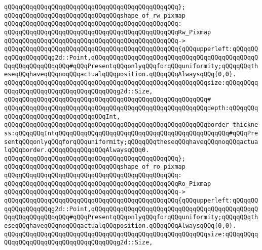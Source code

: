 \verb|qQQqqQQqqQQqqQQqqQQqqQQqqQQqqQQqqQQqqQQqqQQqqQQq};|\newline
\newline
\verb|qQQqqQQqqQQqqQQqqQQqqQQqqQQqqQQqshape_of_rw_pixmap|\newline
\verb|qQQqqQQqqQQqqQQqqQQqqQQqqQQqqQQqqQQqqQQqqQQqqQQq:|\newline
\verb|qQQqqQQqqQQqqQQqqQQqqQQqqQQqqQQqqQQqqQQqqQQqqQQqRw_Pixmap|\newline
\verb|qQQqqQQqqQQqqQQqqQQqqQQqqQQqqQQqqQQqqQQqqQQqqQQq->|\newline
\verb|qQQqqQQqqQQqqQQqqQQqqQQqqQQqqQQqqQQqqQQqqQQqqQQq{qQQqupperleft:qQQqqQQqqQQqqQQqqQQqg2d::Point,qQQqqQQqqQQqqQQqqQQqqQQqqQQqqQQqqQQqqQQqqQQqqQQqqQQqqQQqqQQqqQQq#qQQqPresentqQQqonlyqQQqforqQQquniformity;qQQqqQQqtheseqQQqhaveqQQqnoqQQqactualqQQqposition.qQQqqQQqAlwaysqQQq(0,0).|\newline
\verb|qQQqqQQqqQQqqQQqqQQqqQQqqQQqqQQqqQQqqQQqqQQqqQQqqQQqqQQqsize:qQQqqQQqqQQqqQQqqQQqqQQqqQQqqQQqqQQqqQQqg2d::Size,|\newline
\verb|qQQqqQQqqQQqqQQqqQQqqQQqqQQqqQQqqQQqqQQqqQQqqQQqqQQqqQQq#|\newline
\verb|qQQqqQQqqQQqqQQqqQQqqQQqqQQqqQQqqQQqqQQqqQQqqQQqqQQqqQQqdepth:qQQqqQQqqQQqqQQqqQQqqQQqqQQqqQQqqQQqInt,|\newline
\verb|qQQqqQQqqQQqqQQqqQQqqQQqqQQqqQQqqQQqqQQqqQQqqQQqqQQqqQQqborder_thickness:qQQqqQQqIntqQQqqQQqqQQqqQQqqQQqqQQqqQQqqQQqqQQqqQQqqQQqqQQq#qQQqPresentqQQqonlyqQQqforqQQquniformity;qQQqqQQqtheseqQQqhaveqQQqnoqQQqactualqQQqborder.qQQqqQQqqQQqqQQqAlwaysqQQq0.|\newline
\verb|qQQqqQQqqQQqqQQqqQQqqQQqqQQqqQQqqQQqqQQqqQQqqQQq};|\newline
\newline
\verb|qQQqqQQqqQQqqQQqqQQqqQQqqQQqqQQqshape_of_ro_pixmap|\newline
\verb|qQQqqQQqqQQqqQQqqQQqqQQqqQQqqQQqqQQqqQQqqQQqqQQq:|\newline
\verb|qQQqqQQqqQQqqQQqqQQqqQQqqQQqqQQqqQQqqQQqqQQqqQQqRo_Pixmap|\newline
\verb|qQQqqQQqqQQqqQQqqQQqqQQqqQQqqQQqqQQqqQQqqQQqqQQq->|\newline
\verb|qQQqqQQqqQQqqQQqqQQqqQQqqQQqqQQqqQQqqQQqqQQqqQQq{qQQqupperleft:qQQqqQQqqQQqqQQqqQQqg2d::Point,qQQqqQQqqQQqqQQqqQQqqQQqqQQqqQQqqQQqqQQqqQQqqQQqqQQqqQQqqQQqqQQq#qQQqPresentqQQqonlyqQQqforqQQquniformity;qQQqqQQqtheseqQQqhaveqQQqnoqQQqactualqQQqposition.qQQqqQQqAlwaysqQQq(0,0).|\newline
\verb|qQQqqQQqqQQqqQQqqQQqqQQqqQQqqQQqqQQqqQQqqQQqqQQqqQQqqQQqsize:qQQqqQQqqQQqqQQqqQQqqQQqqQQqqQQqqQQqqQQqg2d::Size,|\newline
